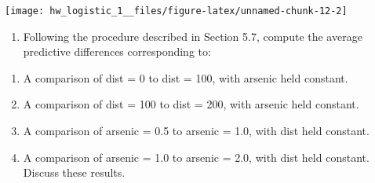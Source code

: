 \documentclass[]{article}
\newenvironment{Shaded}{\begin{snugshade}}{\end{snugshade}}
\newcommand{\KeywordTok}[1]{\textcolor[rgb]{0.13,0.29,0.53}{\textbf{#1}}}
\newcommand{\DataTypeTok}[1]{\textcolor[rgb]{0.13,0.29,0.53}{#1}}
\newcommand{\DecValTok}[1]{\textcolor[rgb]{0.00,0.00,0.81}{#1}}
\newcommand{\StringTok}[1]{\textcolor[rgb]{0.31,0.60,0.02}{#1}}
\newcommand{\CommentTok}[1]{\textcolor[rgb]{0.56,0.35,0.01}{\textit{#1}}}
\newcommand{\OtherTok}[1]{\textcolor[rgb]{0.56,0.35,0.01}{#1}}
\newcommand{\OperatorTok}[1]{\textcolor[rgb]{0.81,0.36,0.00}{\textbf{#1}}}
\newcommand{\NormalTok}[1]{#1}
\providecommand{\tightlist}{%
  \setlength{\itemsep}{0pt}\setlength{\parskip}{0pt}}
\begin{document}
\begin{Shaded}
\end{Shaded}

\begin{center}\texttt{[image: hw\_logistic\_1\_\_files/figure-latex/unnamed-chunk-12-2]} \end{center}

\begin{enumerate}
\def\labelenumi{\arabic{enumi}.}
\setcounter{enumi}{2}
\tightlist
\item
  Following the procedure described in Section 5.7, compute the average
  predictive differences corresponding to:
\end{enumerate}

\begin{enumerate}
\def\labelenumi{\roman{enumi}.}
\tightlist
\item
  A comparison of dist = 0 to dist = 100, with arsenic held constant.
\item
  A comparison of dist = 100 to dist = 200, with arsenic held constant.
\item
  A comparison of arsenic = 0.5 to arsenic = 1.0, with dist held
  constant.
\item
  A comparison of arsenic = 1.0 to arsenic = 2.0, with dist held
  constant. Discuss these results.
\end{enumerate}
\end{document}
